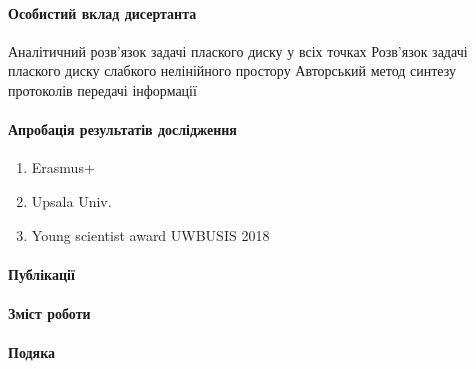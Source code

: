 \paragraph{Особистий вклад дисертанта}

Аналітичний розв'язок задачі плаского диску у всіх точках
Розв'язок задачі плаского диску слабкого нелінійного простору
Авторський метод синтезу протоколів передачі інформації

\paragraph{Апробація результатів дослідження}

\begin{enumerate} 
	\item Erasmus+
	\item Upsala Univ.
	\item Young scientist award UWBUSIS 2018
\end{enumerate} 

\paragraph{Публікації}

\paragraph{Зміст роботи}

\paragraph{Подяка}
